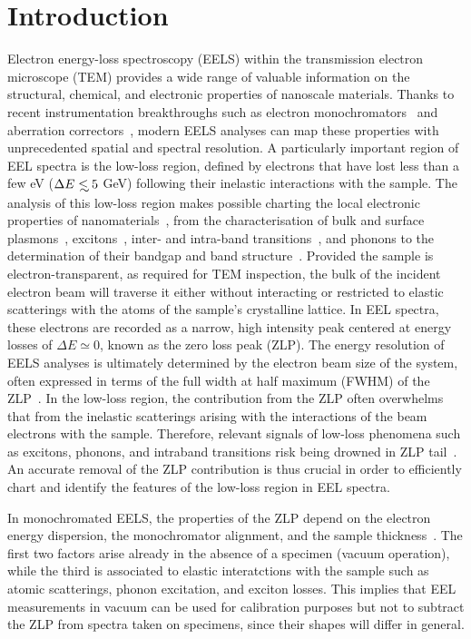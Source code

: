 \section{Introduction}
\label{sec:introduction}

Electron energy-loss spectroscopy (EELS) within the transmission electron microscope (TEM) provides
a wide range of
valuable information on the structural, chemical, and electronic properties of nanoscale materials.
%
Thanks to recent instrumentation breakthroughs
such as electron monochromators~\cite{Terauchi:2005, Freitag:2005} and aberration correctors~\cite{Haider:1998},
modern EELS analyses can map these properties with unprecedented spatial and spectral resolution.
%
A particularly important region of EEL spectra is
the low-loss region, defined by electrons that have lost
less than a few eV ($\Delta E\lsim 5$ GeV) following their inelastic interactions
with the sample.
%
The analysis of this low-loss region makes possible charting the local
electronic properties of nanomaterials~\cite{Geiger:1967}, from the characterisation of
bulk and surface plasmons~\cite{Schaffer:2008}, excitons~\cite{Erni:2005}, 
inter- and intra-band transitions~\cite{Rafferty:1998},
and phonons to the determination of their bandgap and band structure~\cite{Stoger:2008}.
%
Provided the sample is electron-transparent, as required for TEM inspection,
the bulk of the incident electron beam will traverse it
either without interacting or restricted to elastic scatterings with the atoms
of the sample's crystalline lattice.
%
In EEL spectra, these electrons are recorded as a narrow,
high intensity peak centered at energy losses
of $\Delta E\simeq 0$, known as the zero loss peak (ZLP).
%
The energy resolution of EELS analyses is ultimately determined by
the electron beam size of the system, often expressed in terms
of the full width at half maximum (FWHM) of the
ZLP~\cite{Egerton:2009}.
%
In the low-loss region, the contribution from the ZLP
often overwhelms that from the inelastic scatterings arising with
the interactions of the beam electrons
with the sample.
%
Therefore, relevant signals of low-loss phenomena such as excitons,
phonons, and intraband transitions risk being drowned
in ZLP tail~\cite{Abajo:2010}.
%
An accurate removal of the ZLP
contribution is thus crucial in order to efficiently chart and identify the features
of the low-loss region in EEL spectra. 

In monochromated EELS, the properties of the ZLP depend on the electron energy dispersion,
the monochromator alignment, and the sample thickness~\cite{Park:2008, Stoger:2008}.
%
The first two factors arise already in the absence of a specimen (vacuum operation),
while the third is associated
to elastic interatctions with the sample such as atomic scatterings,
phonon excitation, and exciton losses.
%
This implies that EEL measurements in vacuum can be used for calibration purposes
but not to subtract the ZLP from spectra taken on specimens, since their shapes will differ
in general.

